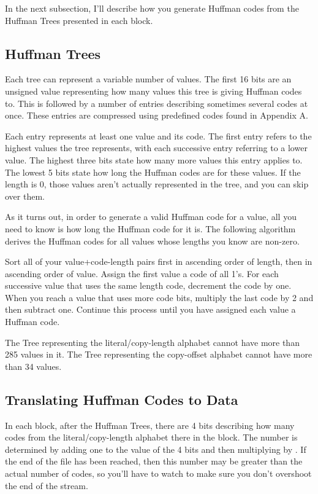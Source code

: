 In the next subsection, I'll describe how you generate Huffman codes from the
Huffman Trees presented in each block.

\subsection{Huffman Trees}
\label{subsec:huffmantrees}

Each tree can represent a variable number of values.  The first 16 bits are an
unsigned value representing how many values this tree is giving Huffman codes
to.  This is followed by a number of entries describing sometimes several codes
at once.  These entries are compressed using predefined codes found in Appendix
A.

Each entry represents at least one value and its code.  The first entry refers
to the highest values the tree represents, with each successive entry referring
to a lower value.  The highest three bits state how many more values this entry
applies to.  The lowest 5 bits state how long the Huffman codes are for these
values.  If the length is 0, those values aren't actually represented in the
tree, and you can skip over them.

As it turns out, in order to generate a valid Huffman code for a value, all you
need to know is how long the Huffman code for it is.  The following algorithm
derives the Huffman codes for all values whose lengths you know are non-zero.

Sort all of your value+code-length pairs first in ascending order of length,
then in ascending order of value.  Assign the first value a code of all 1's.
For each successive value that uses the same length code, decrement the code by
one.  When you reach a value that uses more code bits, multiply the last code by
2 and then subtract one.  Continue this process until you have assigned each
value a Huffman code.

The Tree representing the literal/copy-length alphabet cannot have more than
285 values in it. The Tree representing the copy-offset alphabet cannot have
more than 34 values.

\subsection{Translating Huffman Codes to Data}
\label{subsec:codetodata}

In each block, after the Huffman Trees, there are 4 bits describing how many
codes from the literal/copy-length alphabet there in the block.  The number is
determined by adding one to the value of the 4 bits and then multiplying by
.  If the end of the file has been reached, then this number may be
greater than the actual number of codes, so you'll have to watch to make sure
you don't overshoot the end of the stream.

